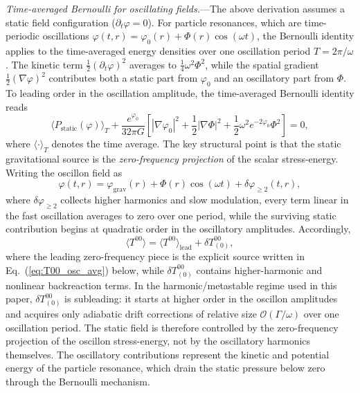 \documentclass[aps,prd,onecolumn,superscriptaddress,nofootinbib,showpacs,12pt,notitlepage]{revtex4-2}
\renewcommand{\order}[1]{\mathcal{O}\!\left(#1\right)}
\begin{document}
\textit{Time-averaged Bernoulli for oscillating fields.}---The
above derivation assumes a static field configuration
($\partial_t\varphi = 0$).  For particle resonances, which
are time-periodic oscillations $\varphi(t,r) = \varphi_0(r) +
\Phi(r)\cos(\omega t)$, the Bernoulli identity applies to the
time-averaged energy densities over one oscillation period
$T = 2\pi/\omega$.  The kinetic term $\frac{1}{2}(\partial_t\varphi)^2$
averages to $\frac{1}{4}\omega^2\Phi^2$, while the spatial gradient
$\frac{1}{2}(\nabla\varphi)^2$ contributes both a static part
from $\varphi_0$ and an oscillatory part from $\Phi$.  To leading
order in the oscillation amplitude, the time-averaged Bernoulli
identity reads
\begin{equation}
  \langle P_{\mathrm{static}}(\varphi) \rangle_T
  + \frac{e^{\varphi_0}}{32\pi G}
    \left[|\nabla\varphi_0|^2 + \frac{1}{2}|\nabla\Phi|^2
      + \frac{1}{2}\omega^2 e^{-2\varphi_0}\Phi^2\right]
  = 0,
\end{equation}
where $\langle \cdot \rangle_T$ denotes the time average.
The key structural point is that the static gravitational source
is the \emph{zero-frequency projection} of the scalar
stress-energy.  Writing the oscillon field as
\begin{equation}
  \varphi(t,r)
  = \varphi_{\mathrm{grav}}(r)
  + \Phi(r)\cos(\omega t)
  + \delta\varphi_{\ge 2}(t,r),
\end{equation}
where $\delta\varphi_{\ge 2}$ collects higher harmonics and slow
modulation, every term linear in the fast oscillation averages to
zero over one period, while the surviving static contribution
begins at quadratic order in the oscillatory amplitudes.
Accordingly,
\begin{equation}
  \langle T^{00}\rangle
  = \langle T^{00}\rangle_{\mathrm{lead}}
  + \delta T^{00}_{(0)},
\end{equation}
where the leading zero-frequency piece is the explicit source
written in Eq.~(\ref{eq:T00_osc_avg}) below, while
$\delta T^{00}_{(0)}$ contains higher-harmonic and nonlinear
backreaction terms.  In the harmonic/metastable regime used in
this paper, $\delta T^{00}_{(0)}$ is subleading: it starts at
higher order in the oscillon amplitudes and acquires only
adiabatic drift corrections of relative size $\order{\Gamma/\omega}$
over one oscillation period.  The static field is therefore
controlled by the zero-frequency projection of the oscillon
stress-energy, not by the oscillatory harmonics themselves.
The oscillatory contributions represent the kinetic and potential
energy of the particle resonance, which drain the static pressure
below zero through the Bernoulli mechanism.
\end{document}
